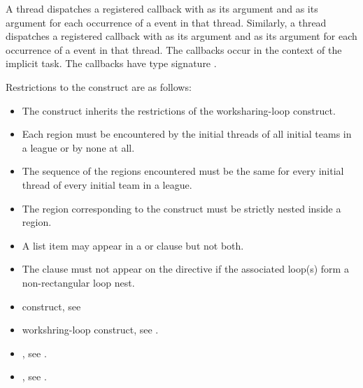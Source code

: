 \tools

A thread dispatches a registered  callback with
 as its  argument and
 as its  argument for each occurrence
of a  event in that thread. Similarly, a thread dispatches
a registered  callback with  as
its  argument and  as its 
argument for each occurrence of a  event in that thread.
The callbacks occur in the context of the implicit task. The callbacks have
type signature .

\restrictions
Restrictions to the  construct are as follows:

\begin{itemize}
\item The  construct inherits the restrictions of the worksharing-loop construct.

\item Each  region must be encountered by the initial
threads of all initial teams in a league or by none at all.

\item The sequence of the  regions encountered must
be the same for every initial thread of every initial team in a league.

\item The region corresponding to the  construct must be
strictly nested inside a  region.

\item A list item may appear in a  or  clause but not both.

\item The  clause must not appear on the 
    directive if the associated loop(s) form a non-rectangular loop nest.
\end{itemize}

\crossreferences
\begin{itemize}
\item {} construct, see

\item workshring-loop construct, see
.

\item {}, see .
\item {}, see
.
\end{itemize}





